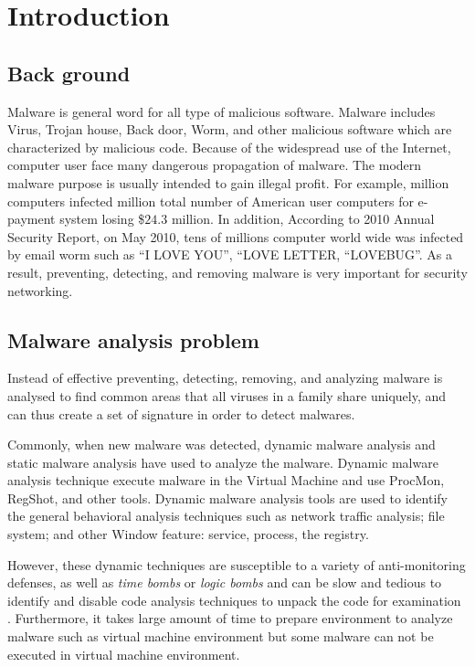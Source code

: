 \chapter{Introduction}\label{chap:1}

%
%
\section{Back ground}Malware is general word for all type of malicious software. Malware includes Virus, Trojan house, Back door, Worm, and other malicious software which are characterized by malicious code.
Because of the widespread use of the Internet, computer user face many dangerous propagation of malware. The modern malware purpose is usually intended to gain illegal profit. For example, million computers infected million total number of American user computers for e-payment system losing \$$24.3$ million\cite{keylogger}. In addition, According to 2010 Annual Security Report, on May 2010, tens of millions computer world wide was infected by email worm such as “I LOVE YOU”, “LOVE LETTER, “LOVEBUG”\cite{Symantec}. As a result, preventing, detecting, and removing malware is very important for security networking.
\section{Malware analysis problem}
Instead of effective preventing, detecting, removing, and analyzing malware is analysed to find common areas that all viruses in a family share uniquely, and can thus create a set of signature in order to detect malwares.

Commonly, when new malware was detected, dynamic malware analysis and static malware analysis have used to analyze the malware.  Dynamic malware analysis technique execute malware in the Virtual Machine and use ProcMon, RegShot, and other tools. Dynamic malware analysis tools are used to identify the general behavioral analysis techniques such as network traffic analysis; file system; and other Window feature: service, process, the registry.

However, these dynamic techniques are susceptible to a variety of anti-monitoring defenses, as well as \emph{time bombs} or \emph{logic bombs} and can be slow and tedious to identify and disable code analysis techniques to unpack the code for examination \cite{georg}. Furthermore, it takes large amount of time to prepare environment to analyze malware such as virtual machine environment but some malware can not be executed in virtual machine environment.

